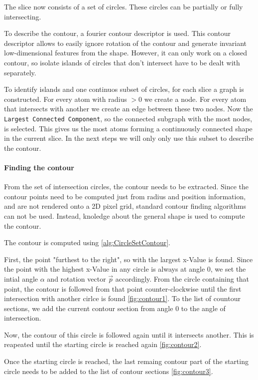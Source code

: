 The slice now consists of a set of circles.
These circles can be partially or fully intersecting. 

To describe the contour, a fourier contour descriptor is used.
This contour descriptor allows to easily ignore rotation of the contour and generate invariant low-dimensional features from the shape.
However, it can only work on a closed contour, so isolate islands of circles that don't intersect have to be dealt with separately.

To identify islands and one continuos subset of circles, for each slice a graph is constructed.
For every atom with radius $>0$ we create a node.
For every atom that intersects with another we create an edge between these two nodes.
Now the \texttt{Largest Connected Component}, so the connected subgraph with the most nodes, is selected.
This gives us the most atoms forming a continuously connected shape in the current slice.
In the next steps we will only only use this subset to describe the contour.

\paragraph{Finding the contour}

From the set of intersection circles, the contour needs to be extracted. 
Since the contour points need to be computed just from radius and position information, and are not rendered onto a 2D pixel grid, standard contour finding algorithms can not be used.
Instead, knoledge about the general shape is used to compute the contour. 

The contour is computed using \autoref{alg:CircleSetContour}.

First, the point "furthest to the right", so with the largest x-Value is found. 
Since the point with the highest x-Value in any circle is always at angle 0, we set the intial angle $\alpha$ and rotation vector $\vec{p}$ accordingly.
From the circle containing that point, the contour is followed from that point counter-clockwise until the first intersection with another cirlce is found \autoref{fig:contour1}.
To the list of countour sections, we add the current contour section from angle 0 to the angle of intersection.

Now, the contour of this circle is followed again until it intersects another. This is reapeated until the starting circle is reached again \autoref{fig:contour2}.

Once the starting circle is reached, the last remaing contour part of the starting circle needs to be added to the list of contour sections \autoref{fig:contour3}.

